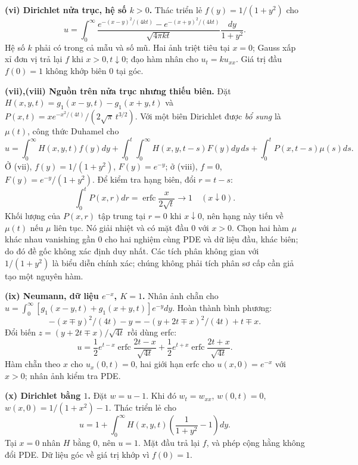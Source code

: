 \documentclass[10pt,a4paper]{article}
\begin{document}
\textbf{(vi) Dirichlet nửa trục, hệ số $k>0$.}
Thác triển lẻ $f(y)=1/(1+y^2)$ cho
\[u=\int_0^\infty
\frac{e^{-(x-y)^2/(4kt)}-e^{-(x+y)^2/(4kt)}}{\sqrt{4\pi kt}}
\frac{dy}{1+y^2}.\]
Hệ số $k$ phải có trong cả mẫu và số mũ. Hai ảnh triệt tiêu tại $x=0$; Gauss xấp xỉ đơn vị trả lại $f$ khi $x>0,t\downarrow0$; đạo hàm nhân cho $u_t=ku_{xx}$. Giá trị đầu $f(0)=1$ không khớp biên $0$ tại góc.

\textbf{(vii),(viii) Nguồn trên nửa trục nhưng thiếu biên.}
Đặt $H(x,y,t)=g_1(x-y,t)-g_1(x+y,t)$ và $P(x,t)=xe^{-x^2/(4t)}/(2\sqrt\pi\,t^{3/2})$. Với một biên Dirichlet được \emph{bổ sung} là $\mu(t)$, công thức Duhamel cho
\[u=\int_0^\infty H(x,y,t)f(y)dy+
\int_0^t\!\int_0^\infty H(x,y,t-s)F(y)dy\,ds+
\int_0^tP(x,t-s)\mu(s)ds.\]
Ở (vii), $f(y)=1/(1+y^2)$, $F(y)=e^{-y}$; ở (viii), $f=0$, $F(y)=e^{-y}/(1+y^2)$. Để kiểm tra hạng biên, đổi $r=t-s$:
\[\int_0^tP(x,r)dr=\operatorname{erfc}\frac{x}{2\sqrt t}\longrightarrow1
\quad(x\downarrow0).\]
Khối lượng của $P(x,r)$ tập trung tại $r=0$ khi $x\downarrow0$, nên hạng này tiến về $\mu(t)$ nếu $\mu$ liên tục. Nó giải nhiệt và có mặt đầu $0$ với $x>0$. Chọn hai hàm $\mu$ khác nhau vanishing gần $0$ cho hai nghiệm cùng PDE và dữ liệu đầu, khác biên; do đó đề gốc không xác định duy nhất. Các tích phân không gian với $1/(1+y^2)$ là biểu diễn chính xác; chúng không phải tích phân sơ cấp cần giả tạo một nguyên hàm.

\textbf{(ix) Neumann, dữ liệu $e^{-x}$, $K=1$.}
Nhân ảnh chẵn cho $u=\int_0^\infty[g_1(x-y,t)+g_1(x+y,t)]e^{-y}dy$. Hoàn thành bình phương:
\[-(x\mp y)^2/(4t)-y=-(y+2t\mp x)^2/(4t)+t\mp x.\]
Đổi biến $z=(y+2t\mp x)/\sqrt{4t}$ rồi dùng erfc:
\[u=\frac12e^{t-x}\operatorname{erfc}\frac{2t-x}{\sqrt{4t}}
+\frac12e^{t+x}\operatorname{erfc}\frac{2t+x}{\sqrt{4t}}.\]
Hàm chẵn theo $x$ cho $u_x(0,t)=0$, hai giới hạn erfc cho $u(x,0)=e^{-x}$ với $x>0$; nhân ảnh kiểm tra PDE.

\textbf{(x) Dirichlet bằng $1$.}
Đặt $w=u-1$. Khi đó $w_t=w_{xx}$, $w(0,t)=0$, $w(x,0)=1/(1+x^2)-1$. Thác triển lẻ cho
\[u=1+\int_0^\infty H(x,y,t)\left(\frac1{1+y^2}-1\right)dy.\]
Tại $x=0$ nhân $H$ bằng $0$, nên $u=1$. Mặt đầu trả lại $f$, và phép cộng hằng không đổi PDE. Dữ liệu góc về giá trị khớp vì $f(0)=1$.
\end{document}
